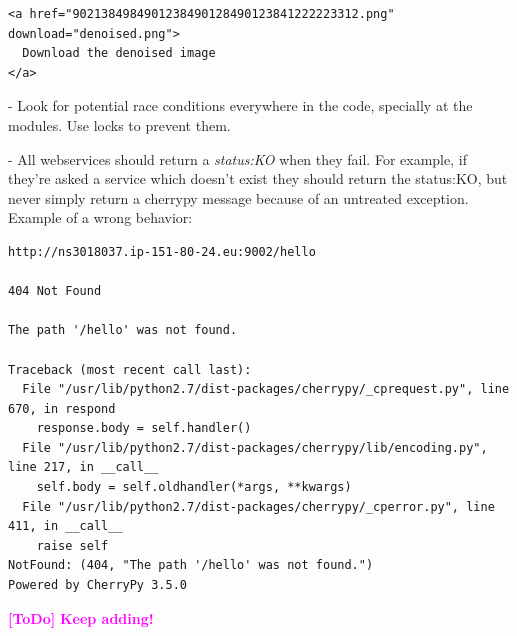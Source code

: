 \documentclass[a4paper,12pt]{article}
\newcommand{\ToDo}[1]{\textcolor{magenta}{\textbf{[ToDo]} \textbf{#1}}}
\begin{document}
\begin{verbatim}
<a href="9021384984901238490128490123841222223312.png" download="denoised.png">
  Download the denoised image
</a>
\end{verbatim}

- Look for potential race conditions everywhere in the code, specially at the modules. Use locks to prevent them.

- All webservices should return a \emph{status:KO} when they fail. For example, if they're asked a service which doesn't exist they should return the status:KO, but never simply return a cherrypy message because of an untreated exception. Example of a wrong behavior:

\begin{verbatim}
http://ns3018037.ip-151-80-24.eu:9002/hello

404 Not Found

The path '/hello' was not found.

Traceback (most recent call last):
  File "/usr/lib/python2.7/dist-packages/cherrypy/_cprequest.py", line 670, in respond
    response.body = self.handler()
  File "/usr/lib/python2.7/dist-packages/cherrypy/lib/encoding.py", line 217, in __call__
    self.body = self.oldhandler(*args, **kwargs)
  File "/usr/lib/python2.7/dist-packages/cherrypy/_cperror.py", line 411, in __call__
    raise self
NotFound: (404, "The path '/hello' was not found.")
Powered by CherryPy 3.5.0
\end{verbatim}

\ToDo{Keep adding!}




\end{document}
